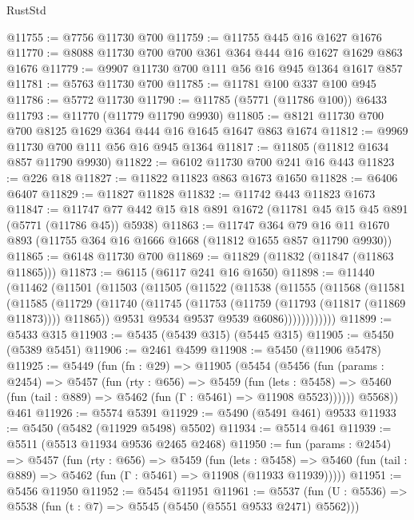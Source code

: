 \begin{lexlean}{RustStd}
\begin{coremodule}
@11755 := @7756 @11730 @700
@11759 := @11755 @445 @16 @1627 @1676
@11770 := @8088 @11730 @700 @700 @361 @364 @444 @16 @1627 @1629 @863 @1676
@11779 := @9907 @11730 @700 @111 @56 @16 @945 @1364 @1617 @857
@11781 := @5763 @11730 @700
@11785 := @11781 @100 @337 @100 @945
@11786 := @5772 @11730
@11790 := @11785 (@5771 (@11786 @100)) @6433
@11793 := @11770 (@11779 @11790 @9930)
@11805 := @8121 @11730 @700 @700 @8125 @1629 @364 @444 @16 @1645 @1647 @863 @1674
@11812 := @9969 @11730 @700 @111 @56 @16 @945 @1364
@11817 := @11805 (@11812 @1634 @857 @11790 @9930)
@11822 := @6102 @11730 @700 @241 @16 @443
@11823 := @226 @18
@11827 := @11822 @11823 @863 @1673 @1650
@11828 := @6406 @6407
@11829 := @11827 @11828
@11832 := @11742 @443 @11823 @1673
@11847 := @11747 @77 @442 @15 @18 @891 @1672 (@11781 @45 @15 @45 @891 (@5771 (@11786 @45)) @5938)
@11863 := @11747
    @364
    @79
    @16
    @11
    @1670
    @893
    (@11755 @364 @16 @1666 @1668 (@11812 @1655 @857 @11790 @9930))
@11865 := @6148 @11730 @700
@11869 := @11829 (@11832 (@11847 (@11863 @11865)))
@11873 := @6115 (@6117 @241 @16 @1650)
@11898 := @11440
    (@11462
      (@11501
        (@11503
          (@11505
            (@11522
              (@11538
                (@11555
                  (@11568
                    (@11581
                      (@11585
                        (@11729
                          (@11740
                            (@11745 (@11753 (@11759 (@11793 (@11817 (@11869 @11873)))) @11865))
                            @9531
                            @9534
                            @9537
                            @9539
                            @6086))))))))))))
@11899 := @5433 @315
@11903 := @5435 (@5439 @315) (@5445 @315)
@11905 := @5450 (@5389 @5451)
@11906 := @2461 @4599
@11908 := @5450 (@11906 @5478)
@11925 := @5449
    (fun (fn : @29) =>
    @11905
      (@5454
        (@5456
          (fun (params : @2454) =>
          @5457
            (fun (rty : @656) =>
            @5459
              (fun (lets : @5458) =>
              @5460 (fun (tail : @889) => @5462 (fun (Γ : @5461) => @11908 @5523))))))
        @5568))
    @461
@11926 := @5574 @5391
@11929 := @5490 (@5491 @461) @9533
@11933 := @5450 (@5482 (@11929 @5498) @5502)
@11934 := @5514 @461
@11939 := @5511 (@5513 @11934 @9536 @2465 @2468)
@11950 := fun (params : @2454) =>
  @5457
    (fun (rty : @656) =>
    @5459
      (fun (lets : @5458) =>
      @5460 (fun (tail : @889) => @5462 (fun (Γ : @5461) => @11908 (@11933 @11939)))))
@11951 := @5456 @11950
@11952 := @5454 @11951
@11961 := @5537 (fun (U : @5536) => @5538 (fun (t : @7) => @5545 (@5450 (@5551 @9533 @2471) @5562)))

\end{coremodule}
\end{lexlean}
